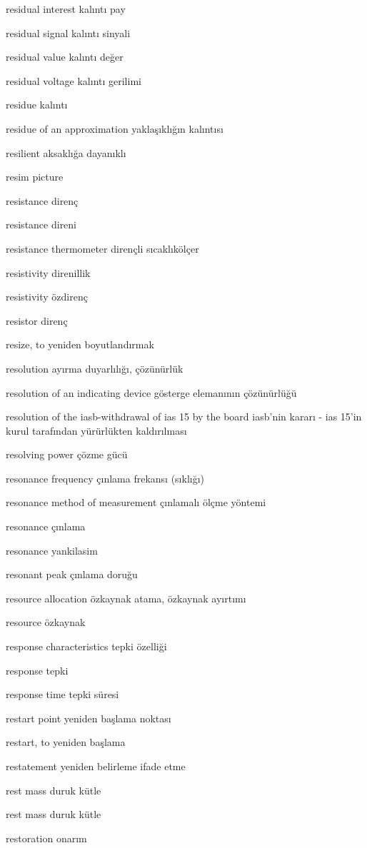 \documentclass[12pt,fleqn]{article}\usepackage{../../common}
\begin{document}
residual interest kalıntı pay

residual signal kalıntı sinyali

residual value kalıntı değer

residual voltage kalıntı gerilimi

residue kalıntı

residue of an approximation yaklaşıklığın kalıntısı

resilient aksaklığa dayanıklı

resim picture

resistance direnç

resistance direni

resistance thermometer dirençli sıcaklıkölçer

resistivity direnillik

resistivity özdirenç

resistor direnç

resize, to yeniden boyutlandırmak

resolution ayırma duyarlılığı, çözünürlük

resolution of an indicating device gösterge elemanının çözünürlüğü

resolution of the iasb-withdrawal of ias 15 by the board iasb'nin kararı - ias 15'in kurul tarafından yürürlükten kaldırılması

resolving power çözme gücü

resonance frequency çınlama frekansı (sıklığı)

resonance method of measurement çınlamalı ölçme yöntemi

resonance çınlama

resonance yankilasim

resonant peak çınlama doruğu

resource allocation özkaynak atama, özkaynak ayırtımı

resource özkaynak

response characteristics tepki özelliği

response tepki

response time tepki süresi

restart point yeniden başlama noktası

restart, to yeniden başlama

restatement yeniden belirleme ifade etme

rest mass duruk kütle

rest mass duruk kütle

restoration onarım
\end{document}
